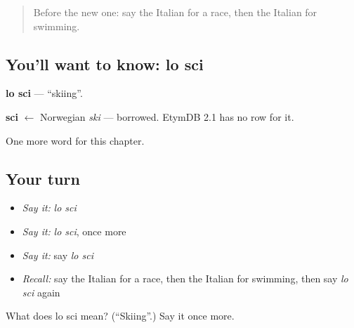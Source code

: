 \begin{quote}
Before the new one: say the Italian for a race, then the Italian for swimming.
\end{quote}

\subsection*{You'll want to know: lo sci}
\textbf{lo sci} — \textquotedblleft{}skiing\textquotedblright{}.

\begin{cousinweb}
\textbf{sci} $\leftarrow$ Norwegian \emph{ski} — borrowed. EtymDB 2.1 has no row for it.
\end{cousinweb}

\begin{grammarlens}[title={What you've built}]
One more word for this chapter.
\end{grammarlens}

\subsection*{Your turn}
\begin{itemize}
\raggedright
  \item \emph{Say it:} \emph{lo sci}
  \item \emph{Say it:} \emph{lo sci}, once more
  \item \emph{Say it:} say \emph{lo sci}
  \item \emph{Recall:} say the Italian for a race, then the Italian for swimming, then say \emph{lo sci} again
\end{itemize}

\begin{tcolorbox}[breakable,colback=teal!4,colframe=teal!35!black,title={Before you move on}]
What does lo sci mean? (\textquotedblleft{}Skiing\textquotedblright{}.) Say it once more.
\end{tcolorbox}
